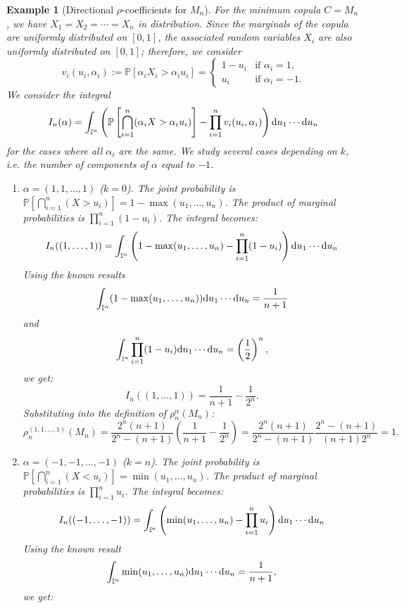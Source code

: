 \documentclass[11pt,a4paper]{article}
\newcommand{\I}{\mbox{${\rm I\!I}$}}
\newtheorem{example}{Example}
\def\I{{\mathbb I}}
\begin{document}
\begin{example}[Directional $\rho$-coefficients for $M_n$]
For the minimum copula $C=M_n$, we have $X_1 = X_2 =\cdots = X_n$ in distribution. Since the marginals of the copula are uniformly distributed on $[0,1]$, the associated random variables $X_i$ are also uniformly distributed on $[0,1]$; therefore, we consider
\begin{equation}\label{eq:Probab}
v_i(u_i, \alpha_i) := \mathbb{P}[\alpha_i X_i > \alpha_i u_i] = \begin{cases} 1 - u_i & \text{if } \alpha_i = 1, \\ u_i & \text{if } \alpha_i = -1. \end{cases}
\end{equation}
We consider the integral
$$I_n(\alpha) = \int_{\I^n} \left( \mathbb{P}\left[\bigcap_{i=1}^n(\alpha_iX>\alpha_iu_i)\right] - \prod_{i=1}^n v_i(u_i, \alpha_i) \right) {\rm d}u_1 \cdots {\rm d}u_n$$
for the cases where all $\alpha_i$ are the same. We study several cases depending on $k$, i.e. the number of components of $\alpha$ equal to $-1$.
\begin{enumerate}
\item $\alpha = (1, 1,\ldots, 1)$ ($k=0$).
The joint probability is $\mathbb{P}\left[\bigcap_{i=1}^n(X > u_i)\right] = 1 - \max(u_1, \ldots, u_n)$.
The product of marginal probabilities is $\prod_{i=1}^n (1 - u_i)$.
The integral becomes:
$$
I_n((1,\ldots,1)) = \int_{\I^n} \left( 1 - \max(u_1, \ldots, u_n) - \prod_{i=1}^n (1 - u_i) \right) {\rm d}u_1 \cdots {\rm d}u_n
$$
Using the known results
$$\int_{\I^n} (1 - \max(u_1, \ldots, u_n)) {\rm d}u_1 \cdots {\rm d}u_n = \frac{1}{n+1}$$
and
$$\int_{\I^n} \prod_{i=1}^n (1 - u_i) {\rm d}u_1 \cdots {\rm d}u_n = \left(\frac{1}{2}\right)^n,$$
we get:
$$
I_n((1,\ldots,1)) = \frac{1}{n+1} - \frac{1}{2^n}.
$$
Substituting into the definition of $\rho_n^\alpha(M_n)$:
$$
\rho_n^{(1,1,\ldots,1)}(M_n) = \frac{2^n(n+1)}{2^n-(n+1)} \left( \frac{1}{n+1} - \frac{1}{2^n} \right) = \frac{2^n(n+1)}{2^n-(n+1)} \frac{2^n - (n+1)}{(n+1)2^n} = 1.
$$
\item $\alpha = (-1,-1, \ldots, -1)$ ($k=n$).
The joint probability is $\mathbb{P}\left[\bigcap_{i=1}^n(X < u_i)\right] = \min(u_1, \ldots, u_n)$.
The product of marginal probabilities is $\prod_{i=1}^n u_i$.
The integral becomes:
$$
I_n((-1,\ldots,-1)) = \int_{\I^n} \left( \min(u_1, \ldots, u_n) - \prod_{i=1}^n u_i \right) {\rm d}u_1 \cdots {\rm d}u_n
$$
Using the known result
$$\int_{\I^n} \min(u_1, \ldots, u_n) {\rm d}u_1 \cdots {\rm d}u_n = \frac{1}{n+1},$$
we get:

\end{enumerate}
\end{example}
\end{document}
